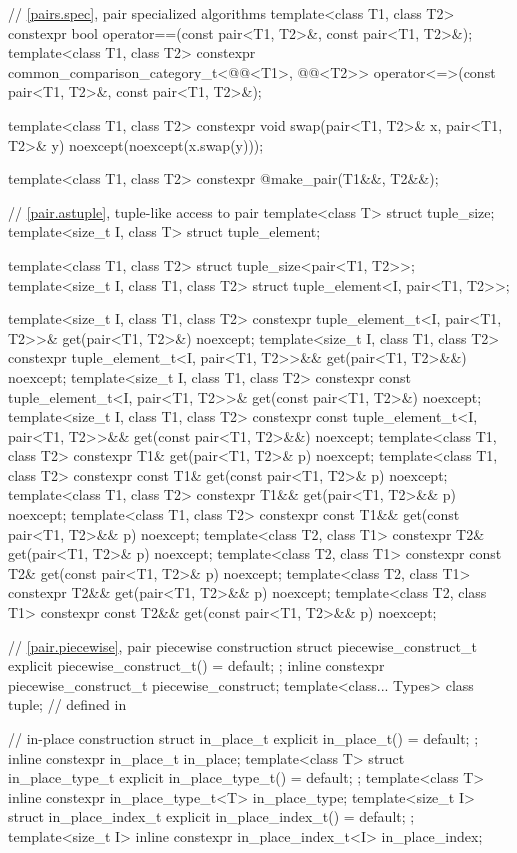 \begin{codeblock}
{  // \ref{pairs.spec}, pair specialized algorithms
  template<class T1, class T2>
    constexpr bool operator==(const pair<T1, T2>&, const pair<T1, T2>&);
  template<class T1, class T2>
    constexpr common_comparison_category_t<@@<T1>,
                                           @@<T2>>
      operator<=>(const pair<T1, T2>&, const pair<T1, T2>&);

  template<class T1, class T2>
    constexpr void swap(pair<T1, T2>& x, pair<T1, T2>& y) noexcept(noexcept(x.swap(y)));

  template<class T1, class T2>
    constexpr @\seebelow@ make_pair(T1&&, T2&&);

  // \ref{pair.astuple}, tuple-like access to pair
  template<class T> struct tuple_size;
  template<size_t I, class T> struct tuple_element;

  template<class T1, class T2> struct tuple_size<pair<T1, T2>>;
  template<size_t I, class T1, class T2> struct tuple_element<I, pair<T1, T2>>;

  template<size_t I, class T1, class T2>
    constexpr tuple_element_t<I, pair<T1, T2>>& get(pair<T1, T2>&) noexcept;
  template<size_t I, class T1, class T2>
    constexpr tuple_element_t<I, pair<T1, T2>>&& get(pair<T1, T2>&&) noexcept;
  template<size_t I, class T1, class T2>
    constexpr const tuple_element_t<I, pair<T1, T2>>& get(const pair<T1, T2>&) noexcept;
  template<size_t I, class T1, class T2>
    constexpr const tuple_element_t<I, pair<T1, T2>>&& get(const pair<T1, T2>&&) noexcept;
  template<class T1, class T2>
    constexpr T1& get(pair<T1, T2>& p) noexcept;
  template<class T1, class T2>
    constexpr const T1& get(const pair<T1, T2>& p) noexcept;
  template<class T1, class T2>
    constexpr T1&& get(pair<T1, T2>&& p) noexcept;
  template<class T1, class T2>
    constexpr const T1&& get(const pair<T1, T2>&& p) noexcept;
  template<class T2, class T1>
    constexpr T2& get(pair<T1, T2>& p) noexcept;
  template<class T2, class T1>
    constexpr const T2& get(const pair<T1, T2>& p) noexcept;
  template<class T2, class T1>
    constexpr T2&& get(pair<T1, T2>&& p) noexcept;
  template<class T2, class T1>
    constexpr const T2&& get(const pair<T1, T2>&& p) noexcept;

  // \ref{pair.piecewise}, pair piecewise construction
  struct piecewise_construct_t {
    explicit piecewise_construct_t() = default;
  };
  inline constexpr piecewise_construct_t piecewise_construct{};
  template<class... Types> class tuple;         // defined in 

  // in-place construction
  struct in_place_t {
    explicit in_place_t() = default;
  };
  inline constexpr in_place_t in_place{};
  template<class T>
    struct in_place_type_t {
      explicit in_place_type_t() = default;
    };
  template<class T> inline constexpr in_place_type_t<T> in_place_type{};
  template<size_t I>
    struct in_place_index_t {
      explicit in_place_index_t() = default;
    };
  template<size_t I> inline constexpr in_place_index_t<I> in_place_index{};
}
\end{codeblock}

